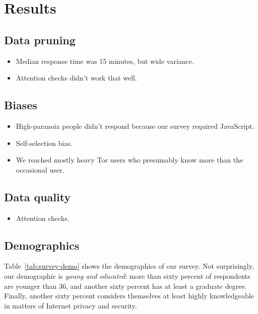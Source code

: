 \section{Results}
\label{sec:results}

\subsection{Data pruning}
\begin{itemize}
    \item Median response time was 15 minutes, but wide variance.
    \item Attention checks didn't work that well.
\end{itemize}

\subsection{Biases}
\begin{itemize}
    \item High-paranoia people didn't respond because our survey required
        JavaScript.
    \item Self-selection bias.
    \item We reached mostly heavy Tor users who presumably know more than the
        occasional user.
\end{itemize}

\subsection{Data quality}
\begin{itemize}
    \item Attention checks.
\end{itemize}

\subsection{Demographics}
Table~\ref{tab:survey-demo} shows the demographics of our survey.  Not
surprisingly, our demographic is \emph{young and educated}: more than sixty
percent of respondents are younger than 36, and another sixty percent has at
least a graduate degree.  Finally, another sixty percent considers themselves
at least highly knowledgeable in matters of Internet privacy and security.

